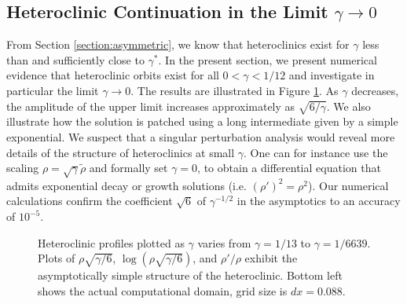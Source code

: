 \documentclass[10pt]{article}
\begin{document}

\subsection{Heteroclinic Continuation in the Limit $\gamma \to 0$}
\label{section:het_cont}

From Section \ref{section:asymmetric}, we know that heteroclinics exist for $\gamma$ less than and sufficiently close to $\gamma^*$.  In the present section, we present numerical evidence that heteroclinic orbits exist for all $0<\gamma<1/12$ and investigate in particular the limit $\gamma \to 0$.  The results are illustrated in  Figure \ref{het_conts}. As $\gamma$ decreases, the amplitude of the upper limit increases approximately as $\sqrt{6/\gamma}$. We also illustrate how the solution is patched using a long intermediate given by a simple exponential. We suspect that a singular perturbation analysis would reveal more details of the structure of heteroclinics at small $\gamma$. One can for instance use the scaling  $\rho = \sqrt{\gamma}\tilde\rho$ and formally set $\gamma = 0$, to obtain  a differential equation that admits exponential decay or growth solutions (i.e. $(\rho')^2 =\rho^2$).    Our numerical calculations confirm the coefficient $\sqrt{6}$ of $\gamma^{-1/2}$ in the asymptotics to an accuracy of $10^{-5}$. 


\begin{figure}[h!]
\caption{Heteroclinic profiles plotted as $\gamma$ varies from $\gamma = 1/13$ to $\gamma =1/6639$. Plots of $\rho\sqrt{\gamma/6}$,  $\log(\rho\sqrt{\gamma/6})$, and $\rho'/\rho$  exhibit the asymptotically simple structure of the heteroclinic. Bottom left shows the actual computational domain, grid size is $dx=0.088$.}
\label{het_conts}
\end{figure} 
\end{document}

